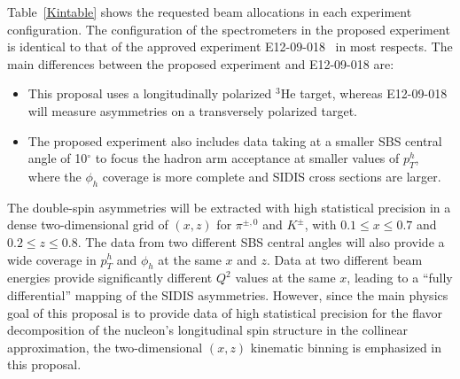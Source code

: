 Table~\ref{Kintable} shows the requested beam allocations in each experiment configuration. The configuration of the spectrometers in the proposed experiment is identical to that of the approved experiment E12-09-018~\cite{SBS_SIDIS} in most respects. The main differences between the proposed experiment and E12-09-018 are: 
\begin{itemize}
\item This proposal uses a longitudinally polarized $^3$He target, whereas E12-09-018 will measure asymmetries on a transversely polarized target. 
\item The proposed experiment also includes data taking at a smaller SBS central angle of 10$^\circ$ to focus the hadron arm acceptance at smaller values of $p_T^h$, where the $\phi_h$ coverage is more complete and SIDIS cross sections are larger. 
\end{itemize}
The double-spin asymmetries will be extracted with high statistical precision in a dense two-dimensional grid of $(x,z)$ for $\pi^{\pm,0}$ and $K^\pm$, with $0.1 \le x \le 0.7$ and $0.2 \le z \le 0.8$. The data from two different SBS central angles will also provide a wide coverage in $p_T^h$ and $\phi_h$ at the same $x$ and $z$. Data at two different beam energies provide significantly different $Q^2$ values at the same $x$, leading to a ``fully differential'' mapping of the SIDIS asymmetries. However, since the main physics goal of this proposal is to provide data of high statistical precision for the flavor decomposition of the nucleon's longitudinal spin structure in the collinear approximation, the two-dimensional $(x,z)$ kinematic binning is emphasized in this proposal.


